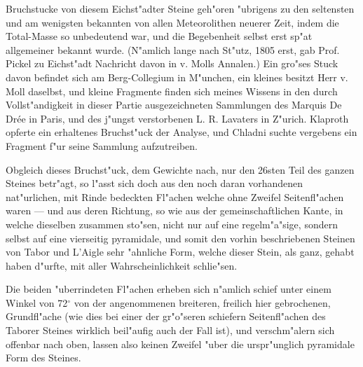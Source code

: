 \documentclass[a4paper, 11pt, oneside, german]{article}
\begin{document}
{{\hspace*{6mm}Bruchstucke von diesem Eichst"adter Steine geh"oren "ubrigens zu den seltensten und am wenigsten bekannten von allen Meteorolithen neuerer Zeit, indem die Total-Masse so unbedeutend war, und die Begebenheit selbst erst sp"at allgemeiner bekannt wurde. (N"amlich lange nach St"utz, 1805 erst, gab Prof. Pickel zu Eichst"adt Nachricht davon in v. Molls Annalen.) Ein gro"ses Stuck davon befindet sich am Berg-Collegium in M"unchen, ein kleines besitzt Herr v. Moll daselbst, und kleine Fragmente finden sich meines Wissens in den durch Vollst"andigkeit in dieser Partie ausgezeichneten Sammlungen des Marquis De Drée in Paris, und des j"ungst verstorbenen L. R. Lavaters in Z"urich. Klaproth opferte ein erhaltenes Bruchst"uck der Analyse, und Chladni suchte vergebens ein Fragment f"ur seine Sammlung aufzutreiben.}}

Obgleich dieses Bruchst"uck, dem Gewichte nach, nur den 26sten Teil des ganzen Steines betr"agt, so l"asst sich doch aus den noch daran vorhandenen nat"urlichen, mit Rinde bedeckten Fl"achen welche ohne Zweifel Seitenfl"achen waren --- und aus deren Richtung, so wie aus der gemeinschaftlichen Kante, in welche dieselben zusammen sto"sen, nicht nur auf eine regelm"a"sige, sondern selbst auf eine vierseitig pyramidale, und somit den vorhin beschriebenen Steinen von Tabor und L'Aigle sehr "ahnliche Form, welche dieser Stein, als ganz, gehabt haben d"urfte, mit aller Wahrscheinlichkeit schlie"sen.

Die beiden "uberrindeten Fl"achen erheben sich n"amlich schief unter einem Winkel von 72$^{\circ}$ von der angenommenen breiteren, freilich hier gebrochenen, Grundfl"ache (wie dies bei einer der gr"o"seren schiefern Seitenfl"achen des Taborer Steines wirklich beil"aufig auch der Fall ist), und verschm"alern sich offenbar nach oben, lassen also keinen Zweifel "uber die urspr"unglich pyramidale Form des Steines.
\end{document}
